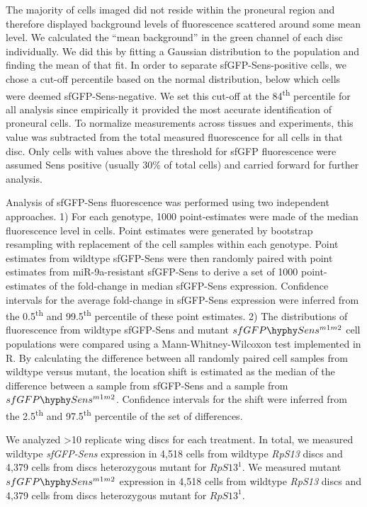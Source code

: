 The majority of cells imaged did not reside within the proneural region and therefore displayed background levels of fluorescence scattered around some mean level. We calculated the ``mean background'' in the green channel of each disc individually. We did this by fitting a Gaussian distribution to the population and finding the mean of that fit. In order to separate sfGFP-Sens-positive cells, we chose a cut-off percentile based on the normal distribution, below which cells were deemed sfGFP-Sens-negative. We set this cut-off at the 84\textsuperscript{th} percentile for all analysis since empirically it provided the most accurate identification of proneural cells. To normalize measurements across tissues and experiments, this value was subtracted from the total measured fluorescence for all cells in that disc. Only cells with values above the threshold for sfGFP fluorescence were assumed Sens positive (usually 30\% of total cells) and carried forward for further analysis.

Analysis of sfGFP-Sens fluorescence was performed using two independent approaches. 1) For each genotype, 1000 point-estimates were made of the median fluorescence level in cells. Point estimates were generated by bootstrap resampling with replacement of the cell samples within each genotype. Point estimates from wildtype sfGFP-Sens were then randomly paired with point estimates from miR-9a-resistant sfGFP-Sens to derive a set of 1000 point-estimates of the fold-change in median sfGFP-Sens expression. Confidence intervals for the average fold-change in sfGFP-Sens expression were inferred from the 0.5\textsuperscript{th} and 99.5\textsuperscript{th} percentile of these point estimates. 2) The distributions of fluorescence from wildtype sfGFP-Sens and mutant $sfGFP\hyphy Sens^{m1m2}$ cell populations were compared using a Mann-Whitney-Wilcoxon test implemented in R. By calculating the difference between all randomly paired cell samples from wildtype versus mutant, the location shift is estimated as the median of the difference between a sample from sfGFP-Sens and a sample from $sfGFP\hyphy Sens^{m1m2}$. Confidence intervals for the shift were inferred from the 2.5\textsuperscript{th} and 97.5\textsuperscript{th} percentile of the set of differences.

We analyzed \textgreater{}10 replicate wing discs for each treatment. In total, we measured wildtype \textit{sfGFP-Sens} expression in 4,518 cells from wildtype \textit{RpS13} discs and 4,379 cells from discs heterozygous mutant for $RpS13^1$. We measured mutant $sfGFP\hyphy Sens^{m1m2}$ expression in 4,518 cells from wildtype \textit{RpS13} discs and 4,379 cells from discs heterozygous mutant for $RpS13^1$.

